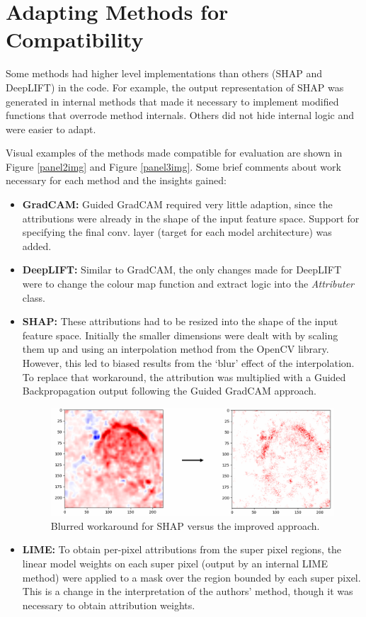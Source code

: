 \documentclass[main]{subfiles}
\begin{document}
\newpage
\section{Adapting Methods for Compatibility}  \label{sec:adaption}

Some methods had higher level implementations than others (SHAP and DeepLIFT) in the code. For example, the output representation of SHAP was generated in internal methods that made it necessary to implement modified functions that overrode method internals. Others did not hide internal logic and were easier to adapt.

Visual examples of the methods made compatible for evaluation are shown in Figure \ref{panel2img} and Figure \ref{panel3img}. Some brief comments  about work necessary for each method and the insights gained:

\begin{itemize}
\item \textbf{GradCAM:} Guided GradCAM required very little adaption, since the attributions were already in the shape of the input feature space. Support for specifying the final conv. layer (target for each model architecture) was added.
\item \textbf{DeepLIFT:} Similar to GradCAM, the only changes made for DeepLIFT were to change the colour map function and extract logic into the \textit{Attributer} class.
\item \textbf{SHAP:} These attributions had to be resized into the shape of the input feature space. Initially the smaller dimensions were dealt with by scaling them up and using an interpolation method from the OpenCV library. However, this led to biased results from the `blur' effect of the interpolation. To replace that workaround, the attribution was multiplied with a Guided Backpropagation output following the Guided GradCAM approach.
\begin{figure}[htbp]
\centering
\includegraphics[scale=0.3]{shap_change.png}
\caption{Blurred workaround for SHAP versus the improved approach.}
\label{panelimg}
\end{figure}


\item \textbf{LIME:} To obtain per-pixel attributions from the super pixel regions, the linear model weights on each super pixel (output by an internal LIME method) were applied to a mask over the region bounded by each super pixel. This is a change in the interpretation of the authors' method, though it was necessary to obtain attribution weights.
\end{itemize}
\end{document}
